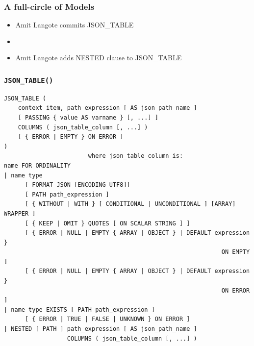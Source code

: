 \begin{frame}
  \frametitle{A full-circle of Models}
  \begin{itemize}
    \item Amit Langote commits JSON\_TABLE

    \item[]

    \item Amit Langote adds NESTED clause to JSON\_TABLE

  \end{itemize}
\end{frame}

\begin{frame}[fragile]
  \frametitle{\texttt{JSON\_TABLE()}}
  \begin{lstlisting}[basicstyle=\scriptsize\ttfamily]
JSON_TABLE (
    context_item, path_expression [ AS json_path_name ]
    [ PASSING { value AS varname } [, ...] ]
    COLUMNS ( json_table_column [, ...] )
    [ { ERROR | EMPTY } ON ERROR ]
)
                        where json_table_column is:
name FOR ORDINALITY
| name type
      [ FORMAT JSON [ENCODING UTF8]]
      [ PATH path_expression ]
      [ { WITHOUT | WITH } [ CONDITIONAL | UNCONDITIONAL ] [ARRAY] WRAPPER ]
      [ { KEEP | OMIT } QUOTES [ ON SCALAR STRING ] ]
      [ { ERROR | NULL | EMPTY { ARRAY | OBJECT } | DEFAULT expression }
                                                              ON EMPTY ]
      [ { ERROR | NULL | EMPTY { ARRAY | OBJECT } | DEFAULT expression }
                                                              ON ERROR ]
| name type EXISTS [ PATH path_expression ]
      [ { ERROR | TRUE | FALSE | UNKNOWN } ON ERROR ]
| NESTED [ PATH ] path_expression [ AS json_path_name ]
                  COLUMNS ( json_table_column [, ...] )
  \end{lstlisting}

\end{frame}

